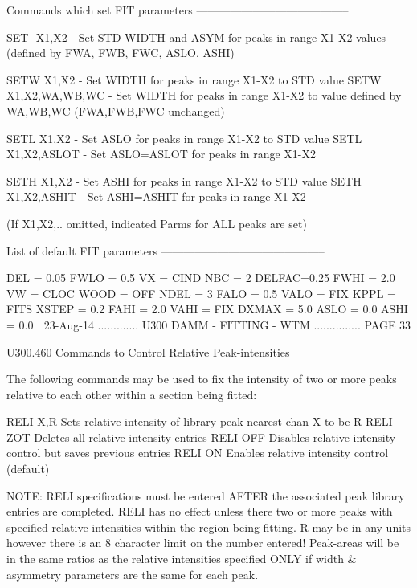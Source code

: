    Commands which set FIT parameters -----------------------------------------
 
   SET- X1,X2          - Set STD WIDTH and ASYM for peaks in range X1-X2
                         values (defined by FWA, FWB, FWC, ASLO, ASHI)
 
   SETW X1,X2          - Set WIDTH for peaks in range X1-X2 to STD value
   SETW X1,X2,WA,WB,WC - Set WIDTH for peaks in range X1-X2 to value
                         defined by WA,WB,WC (FWA,FWB,FWC unchanged)
 
   SETL X1,X2          - Set ASLO  for peaks in range X1-X2 to STD value
   SETL X1,X2,ASLOT    - Set ASLO=ASLOT for peaks in range X1-X2
 
   SETH X1,X2          - Set ASHI  for peaks in range X1-X2 to STD value
   SETH X1,X2,ASHIT    - Set ASHI=ASHIT for peaks in range X1-X2
 
   (If X1,X2,.. omitted, indicated Parms for ALL peaks are set)
 
   List of default FIT parameters --------------------------------------------
 
   DEL   = 0.05    FWLO = 0.5      VX   = CIND    NBC  = 2
   DELFAC=0.25     FWHI = 2.0      VW   = CLOC    WOOD = OFF
   NDEL  = 3       FALO = 0.5      VALO = FIX     KPPL = FITS
   XSTEP = 0.2     FAHI = 2.0      VAHI = FIX
   DXMAX = 5.0     ASLO = 0.0
                   ASHI = 0.0
    
   23-Aug-14 ............. U300  DAMM - FITTING - WTM ............... PAGE  33
 
   U300.460  Commands to Control Relative Peak-intensities
 
   The following commands may be used to fix the  intensity  of  two  or  more
   peaks relative to each other within a section being fitted:
 
   RELI  X,R   Sets relative intensity of library-peak nearest chan-X to be R
   RELI  ZOT   Deletes all relative intensity entries
   RELI  OFF   Disables relative intensity control but saves previous entries
   RELI  ON    Enables  relative intensity control (default)
 
   NOTE:  RELI  specifications  must  be  entered  AFTER  the  associated peak
   library entries are completed. RELI has no effect unless there two or  more
   peaks  with specified relative intensities within the region being fitting.
   R may be in any units however there is an 8 character limit on  the  number
   entered!  Peak-areas will be in the same ratios as the relative intensities
   specified ONLY if width & asymmetry parameters are the same for each peak.
 
